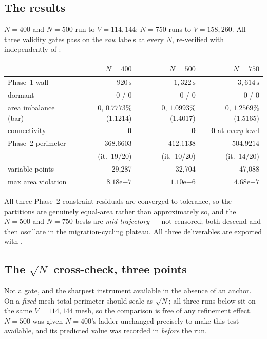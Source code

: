 \documentclass[11pt,a4paper]{article}
\begin{document}
\subsection*{The results}

\(N{=}400\) and \(N{=}500\) run to \(V = 114{,}144\); \(N{=}750\) runs to
\(V = 158{,}260\). All three validity gates pass on the \emph{raw} labels at every
\(N\), re-verified with  independently
of :

\begin{center}\small
\begin{tabular}{@{}lrrr@{}}
\toprule
 & \(N{=}400\) & \(N{=}500\) & \(N{=}750\) \\
\midrule
Phase~1 wall & \(920\,\mathrm{s}\) & \(1{,}322\,\mathrm{s}\) & \(3{,}614\,\mathrm{s}\) \\
dormant & 0 / 0 & 0 / 0 & 0 / 0 \\
area imbalance (bar) & 0, \(\mathbf{0.7773\%}\) (1.1214) & 0, \(\mathbf{1.0993\%}\) (1.4017) & 0, \(\mathbf{1.2569\%}\) (1.5165) \\
connectivity & \(\mathbf{0}\) & \(\mathbf{0}\) & \(\mathbf{0}\) at \emph{every} level \\
Phase~2 perimeter & \(\mathbf{368.6603}\) & \(\mathbf{412.1138}\) & \(\mathbf{504.9214}\) \\
 & (it.\ 19/20) & (it.\ 10/20) & (it.\ 14/20) \\
variable points & 29{,}287 & 32{,}704 & 47{,}088 \\
max area violation & \(8.18\mathrm{e}{-7}\) & \(1.10\mathrm{e}{-6}\) & \(4.68\mathrm{e}{-7}\) \\
\bottomrule
\end{tabular}
\end{center}

All three Phase~2 constraint residuals are converged to tolerance, so the
partitions are genuinely equal-area rather than approximately so, and the
\(N{=}500\) and \(N{=}750\) bests are \emph{mid-trajectory} --- not censored; both
descend and then oscillate in the migration-cycling plateau. All three
deliverables are exported with .

\subsection*{The \(\sqrt{N}\) cross-check, three points}

Not a gate, and the sharpest instrument available in the absence of an anchor. On
a \emph{fixed} mesh total perimeter should scale as \(\sqrt{N}\); all three runs
below sit on the same \(V = 114{,}144\) mesh, so the comparison is free of any
refinement effect. \(N{=}500\) was given \(N{=}400\)'s ladder unchanged precisely
to make this test available, and its predicted value was recorded in
 \emph{before} the run.
\end{document}
